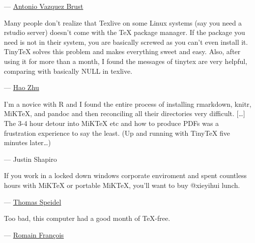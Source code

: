 \documentclass[
  xelatex,ja=standard,jafont=noto]{bxjsreport}
\renewenvironment{quote}{\def\FrameCommand{{\color{quotebarcolor}{\vrule width 3pt}}\hspace{10pt}}\MakeFramed{\advance\hsize-\width\FrameRestore}}{\endMakeFramed}
\begin{document}
\begin{quote}
---
\href{https://github.com/rstudio/bookdown/issues/292\#issuecomment-356480809}{Antonio
Vazquez Brust}
\end{quote}

\begin{quote}
Many people don't realize that Texlive on some Linux systems (say you
need a rstudio server) doesn't come with the TeX package manager. If the
package you need is not in their system, you are basically screwed as
you can't even install it. TinyTeX solves this problem and makes
everything sweet and easy. Also, after using it for more than a month, I
found the messages of tinytex are very helpful, comparing with basically
NULL in texlive.
\end{quote}

\begin{quote}
---
\href{https://community.rstudio.com/t/texlive-distribution-on-centos-for-rstudio-server-and-connect/2916}{Hao
Zhu}
\end{quote}

\begin{quote}
I'm a novice with R and I found the entire process of installing
rmarkdown, knitr, MiKTeX, and pandoc and then reconciling all their
directories very difficult. {[}\ldots{]} The 3-4 hour detour into MiKTeX
etc and how to produce PDFs was a frustration experience to say the
least. (Up and running with TinyTeX five minutes later\ldots)
\end{quote}

\begin{quote}
--- Justin Shapiro
\end{quote}

\begin{quote}
If you work in a locked down windows corporate enviroment and spent
countless hours with MiKTeX or portable MiKTeX, you'll want to buy
@xieyihui lunch.
\end{quote}

\begin{quote}
---
\href{https://twitter.com/ThomasSpeidel/status/957856056108920835}{Thomas
Speidel}
\end{quote}

\begin{quote}
Too bad, this computer had a good month of TeX-free.
\end{quote}

\begin{quote}
---
\href{https://twitter.com/romain_francois/status/979022989634174976}{Romain
François}
\end{quote}
\end{document}
